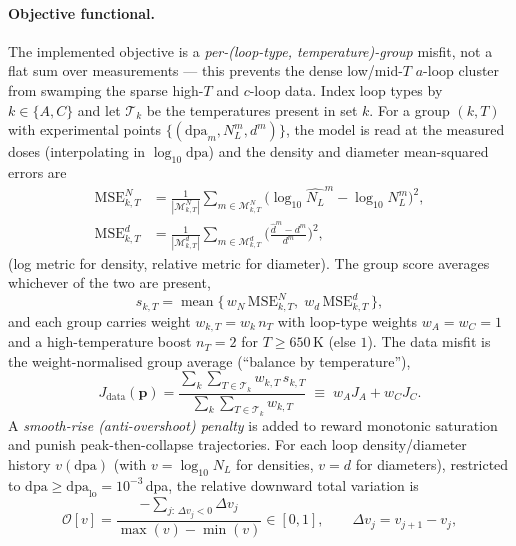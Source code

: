 \documentclass{article}
\newcommand{\param}{\bm{p}}
\newcommand{\dpa}{\mathrm{dpa}}
\newcommand{\NL}{N_{L}}
\begin{document}
\paragraph{Objective functional.}
The implemented objective is a \emph{per-(loop-type, temperature)-group} misfit,
not a flat sum over measurements --- this prevents the dense low/mid-$T$
$a$-loop cluster from swamping the sparse high-$T$ and $c$-loop data. Index loop
types by $k\in\{A,C\}$ and let $\mathcal{T}_k$ be the temperatures present in set
$k$. For a group $(k,T)$ with experimental points $\{(\dpa_m,\NL^m,d^m)\}$, the
model is read at the measured doses (interpolating in $\log_{10}\dpa$) and the
density and diameter mean-squared errors are
\begin{align}
  \mathrm{MSE}^{N}_{k,T} &= \frac{1}{|\mathcal{M}^N_{k,T}|}\!\!
     \sum_{m\in\mathcal{M}^N_{k,T}}\!\!\big(\log_{10}\widehat{\NL}^m-\log_{10}\NL^m\big)^2,\\
  \mathrm{MSE}^{d}_{k,T} &= \frac{1}{|\mathcal{M}^d_{k,T}|}\!\!
     \sum_{m\in\mathcal{M}^d_{k,T}}\!\!\Big(\frac{\widehat{d}^m-d^m}{d^m}\Big)^2,
\end{align}
(log metric for density, relative metric for diameter). The group score averages
whichever of the two are present,
\begin{equation}
  s_{k,T}=\operatorname{mean}\big\{\,w_{N}\,\mathrm{MSE}^{N}_{k,T},\;
                                    w_{d}\,\mathrm{MSE}^{d}_{k,T}\,\big\},
\end{equation}
and each group carries weight $w_{k,T}=w_k\,n_T$ with loop-type weights
$w_A=w_C=1$ and a high-temperature boost $n_T=2$ for $T\ge 650\,$K (else $1$).
The data misfit is the weight-normalised group average (``balance by
temperature''),
\begin{equation}
  J_{\mathrm{data}}(\param)=
  \frac{\sum_{k}\sum_{T\in\mathcal{T}_k} w_{k,T}\,s_{k,T}}
       {\sum_{k}\sum_{T\in\mathcal{T}_k} w_{k,T}}
  \;\equiv\; w_A J_A + w_C J_C .
\end{equation}
A \emph{smooth-rise (anti-overshoot) penalty} is added to reward monotonic
saturation and punish peak-then-collapse trajectories. For each loop
density/diameter history $v(\dpa)$ (with $v=\log_{10}\NL$ for densities, $v=d$ for
diameters), restricted to $\dpa\ge\dpa_{\mathrm{lo}}=10^{-3}\,$dpa, the relative
downward total variation is
\begin{equation}
  \mathcal{O}[v]=\frac{-\sum_{j:\,\Delta v_j<0}\Delta v_j}{\max(v)-\min(v)}
  \in[0,1],\qquad \Delta v_j=v_{j+1}-v_j,
\end{equation}
\end{document}
